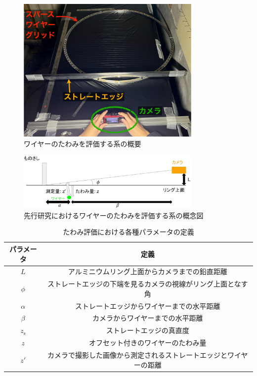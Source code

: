 \documentclass[../../main.tex]{subfiles}
\begin{document}
\begin{figure}[H]
    \centering
    \includegraphics[width=0.8\textwidth]{wiregrid/wiresag_setup_overview_old.pdf}
    \caption{ワイヤーのたわみを評価する系の概要}
    \label{fig:wiresag_setup_overview_old}    
\end{figure}
\begin{figure}[H]
    \centering
    \includegraphics[width=0.8\textwidth]{wiregrid/wiresag_setup_old.pdf}
    \caption{先行研究におけるワイヤーのたわみを評価する系の概念図\cite{swg:murata}}
    \label{fig:wiresag_setup_old}
\end{figure}
\begin{table}[H]
    \centering
    \caption{たわみ評価における各種パラメータの定義}
    \begin{tabular}{|c|c|}
        \hline
        パラメータ & 定義 \\
        \hline
        $L$ & アルミニウムリング上面からカメラまでの鉛直距離 \\
        $\phi$ & ストレートエッジの下端を見るカメラの視線がリング上面となす角 \\
        $\alpha$ & ストレートエッジからワイヤーまでの水平距離 \\
        $\beta$ & カメラからワイヤーまでの水平距離 \\
        $z_{\mathrm{s}}$ & ストレートエッジの真直度 \\
        $z$ & オフセット付きのワイヤーのたわみ量 \\
        $z'$ & カメラで撮影した画像から測定されるストレートエッジとワイヤーの距離 \\
        \hline
    \end{tabular}
    \label{tab:wiresag_setup_old}
\end{table}
\end{document}
